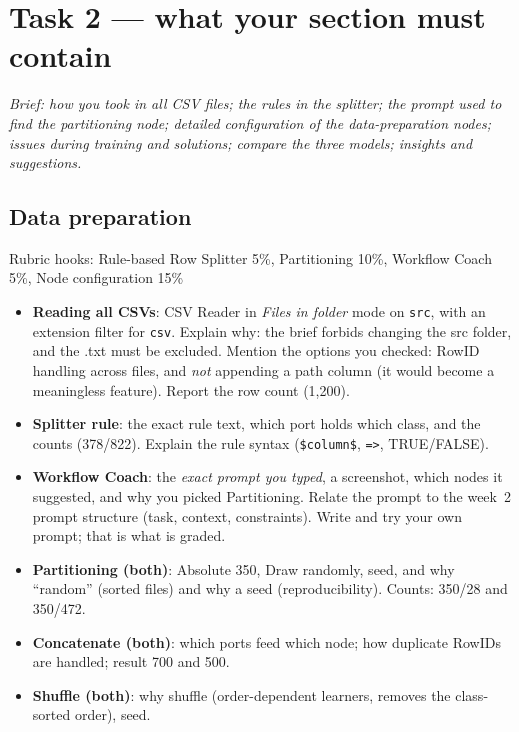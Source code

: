 \documentclass[11pt,a4paper]{article}
\begin{document}
\section{Task 2 --- what your section must contain}
\textit{Brief: how you took in all CSV files; the rules in the splitter; the prompt used to find the
partitioning node; detailed configuration of the data-preparation nodes; issues during training and
solutions; compare the three models; insights and suggestions.}

\subsection{Data preparation}
\begin{rubric}{Rubric hooks: Rule-based Row Splitter 5\%, Partitioning 10\%, Workflow Coach 5\%, Node configuration 15\%}
\begin{itemize}
  \item \textbf{Reading all CSVs}: CSV Reader in \emph{Files in folder} mode on \texttt{src}, with an
        extension filter for \texttt{csv}. Explain why: the brief forbids changing the src folder, and the
        .txt must be excluded. Mention the options you checked: RowID handling across files, and
        \emph{not} appending a path column (it would become a meaningless feature). Report the row
        count (1,200).
  \item \textbf{Splitter rule}: the exact rule text, which port holds which class, and the counts
        (378/822). Explain the rule syntax (\texttt{\$column\$}, \texttt{=>}, TRUE/FALSE).
  \item \textbf{Workflow Coach}: the \emph{exact prompt you typed}, a screenshot, which nodes it
        suggested, and why you picked Partitioning. Relate the prompt to the week~2 prompt structure
        (task, context, constraints). Write and try your own prompt; that is what is graded.
  \item \textbf{Partitioning (both)}: Absolute 350, Draw randomly, seed, and why ``random''
        (sorted files) and why a seed (reproducibility). Counts: 350/28 and 350/472.
  \item \textbf{Concatenate (both)}: which ports feed which node; how duplicate RowIDs are handled;
        result 700 and 500.
  \item \textbf{Shuffle (both)}: why shuffle (order-dependent learners, removes the class-sorted
        order), seed.
\end{itemize}
\end{rubric}
\end{document}
